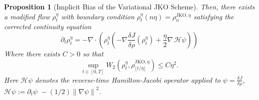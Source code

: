 \documentclass[reqno,11pt,letterpaper]{amsart}
\theoremstyle{plain}
\newtheorem{prop}{Proposition}
\theoremstyle{definition}
\theoremstyle{remark}
\newcommand{\wagrad}{\nabla \frac{\delta J}{\delta \rho}}
\newcommand{\wadel}{\frac{\delta J}{\delta \rho}}
\newcommand{\abs}[1]{\left|#1\right|}
\newcommand{\gives}{\rightarrow}
\newcommand{\R}{\mathbb R}
\newcommand{\lr}[1]{\left(#1\right)}
\begin{document}
\begin{prop}[Implicit Bias of the Variational JKO Scheme]

Then, there exists a modified flow $\rho_t^\eta$ with boundary condition $\rho_t^\eta(n\eta)=\rho_{n}^{\mathrm{JKO}, \eta}$ satisfying the corrected continuity equation
    \begin{equation}
        \partial_{t} \rho_{t}^{\eta} = - \nabla \cdot \left( \rho_{t}^{\eta} \left(
    - \wagrad (\rho_{t}^{\eta}) + \frac{\eta}{2} \nabla \,\mathcal{H} \psi
    \right) \right)
    \end{equation}
Where there exists $C>0$ so that 
\begin{equation}\label{eq:JKO-approx}
        \sup_{t\in [0,T]} W_2\lr{\rho_t^\eta, \rho_{\lfloor t/\eta \rfloor}^{\mathrm{JKO}, \eta}} \leq C \eta^2.
\end{equation}
Here $\mathcal{H} \psi$ denotes the reverse-time Hamilton-Jacobi operator \cite{reverseHJ} applied to $\psi =\wadel$, $\mathcal{H}\psi := \partial_{t} \psi \,\, - (1/2) \left\lVert \nabla \psi \right\rVert^{2}$.




\end{prop}
\end{document}
